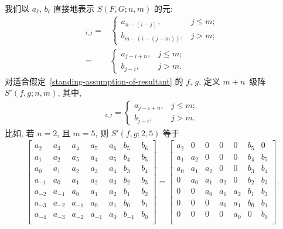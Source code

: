 \documentclass[../libro.tex]{subfiles}
\begin{document}
\begin{example}
    我们以 \(a_\ell\), \(b_\ell\)
    直接地表示 \(S(F, G; n, m)\) 的元:
    \begin{align*}
        [S(F, G; n, m)]_{i,j}
        = {} &
        \begin{cases}
            a_{n-(i-j)},     & j \leq m; \\
            b_{m-(i-(j-m))}, & j > m;
        \end{cases}
        \\
        = {} &
        \begin{cases}
            a_{j-i+n}, & j \leq m; \\
            b_{j-i},   & j > m.
        \end{cases}
    \end{align*}
    对适合假定~\ref{standing-assumption-of-resultant}
    的 \(f\), \(g\),
    定义 \(m + n\)~级阵 \(S'(f, g; n, m)\),
    其中,
    \begin{align*}
        [S'(f, g; n, m)]_{i,j} =
        \begin{cases}
            a_{j-i+n}, & j \leq m; \\
            b_{j-i},   & j > m.
        \end{cases}
    \end{align*}
    比如, 若 \(n = 2\), 且 \(m = 5\),
    则 \(S'(f, g; 2, 5)\) 等于
    \begin{align*}
        \begin{bmatrix}
            a_2    & a_3    & a_4    & a_5    & a_6 & b_5    & b_6 \\
            a_1    & a_2    & a_5    & a_4    & a_5 & b_4    & b_5 \\
            a_0    & a_1    & a_2    & a_3    & a_4 & b_3    & b_4 \\
            a_{-1} & a_0    & a_1    & a_2    & a_3 & b_2    & b_3 \\
            a_{-2} & a_{-1} & a_0    & a_1    & a_2 & b_1    & b_2 \\
            a_{-3} & a_{-2} & a_{-1} & a_0    & a_1 & b_0    & b_1 \\
            a_{-4} & a_{-3} & a_{-2} & a_{-1} & a_0 & b_{-1} & b_0 \\
        \end{bmatrix}
        =
        \begin{bmatrix}
            a_2 & 0   & 0   & 0   & 0   & b_5 & 0   \\
            a_1 & a_2 & 0   & 0   & 0   & b_4 & b_5 \\
            a_0 & a_1 & a_2 & 0   & 0   & b_3 & b_4 \\
            0   & a_0 & a_1 & a_2 & 0   & b_2 & b_3 \\
            0   & 0   & a_0 & a_1 & a_2 & b_1 & b_2 \\
            0   & 0   & 0   & a_0 & a_1 & b_0 & b_1 \\
            0   & 0   & 0   & 0   & a_0 & 0   & b_0 \\
        \end{bmatrix}.
    \end{align*}


\end{example}
\end{document}
